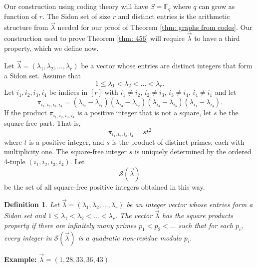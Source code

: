\documentclass[12pt]{article}%
\newtheorem{definition}[theorem]{Definition}
\newcommand{\coeff}[2]{( \lambda_{i_#1} - \lambda_{i_#2} ) }
\begin{document}
{Our construction using coding theory will have $S  = \mathbb{F}_q$ where $q$ can grow as function of $r$.  The Sidon set of size $r$ and distinct entries is the arithmetic structure from $\vec{ \lambda}$ needed for our proof of Theorem \ref{thm: graphs from codes}.  
Our construction used to prove Theorem \ref{thm: 456} will require $\vec{ \lambda}$ to have a third property}, which we define now.   

Let $\vec{ \lambda } = ( \lambda_1 , \lambda_2 , \dots , \lambda_r)$ be a vector whose entries are distinct integers that form a Sidon set.  Assume that 
\[
1 \leq \lambda_1 < \lambda_2 < \dots < \lambda_r.
\]
Let  $i_1,i_2,i_3,i_4$ be indices in $[r]$ with $i_1 \neq i_2$, $i_2 \neq i_3$, $i_3 \neq i_4$, $i_4 \neq i_1$ and let \begin{equation}\label{eq:special product}
\pi_{i_1 , i_2 , i_3 , i_4} = \coeff{2}{1} \coeff{3}{2} \coeff{4}{3} \coeff{1}{4}.  
\end{equation}
If the product $\pi_{i_1,i_2,i_3,i_4}$ is a positive integer that is not a square, let $s$ be the square-free part.  That is,
\[
\pi_{i_1,i_2,i_3,i_4} = s t^2
\]
where $t$ is a positive integer, and $s$ is the product of distinct primes, each with multiplicity one.  
The square-free integer $s$ is uniquely determined by 
the ordered 4-tuple $(i_1,i_2,i_3,i_4)$.  Let 
\[
\mathcal{S}( \vec{ \lambda} )\]
be the set of all square-free positive integers obtained in this way. 

\begin{definition}
Let $\vec{\lambda} = ( \lambda_1 , \lambda_2 , \dots , \lambda_r)$ be an integer vector whose entries form a Sidon set and $1 \leq \lambda_1 < \lambda_2 < \dots < \lambda_r$.  The vector $\vec{ \lambda}$ has the \emph{square products property} if there are infinitely many primes $p_1 < p_2 < 
\dots $ such that for each $p_i$, every integer in $\mathcal{S} ( \vec{ \lambda} )$ is a quadratic non-residue modulo $p_i$.
\end{definition}

\noindent
\textbf{Example:}  $\vec{ \lambda} = (1,28,33,36,43)$
\end{document}
